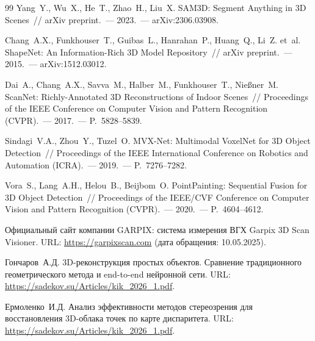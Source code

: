 \documentclass{misisarticle}
\begin{document}
\begin{thebibliography}{99}
 Yang~Y., Wu~X., He~T., Zhao~H., Liu~X. SAM3D: Segment Anything in 3D Scenes~// arXiv preprint.~--- 2023.~--- arXiv:2306.03908.

 Chang~A.X., Funkhouser~T., Guibas~L., Hanrahan~P., Huang~Q., Li~Z. et~al. ShapeNet: An Information-Rich 3D Model Repository~// arXiv preprint.~--- 2015.~--- arXiv:1512.03012.

 Dai~A., Chang~A.X., Savva~M., Halber~M., Funkhouser~T., Nie{\ss}ner~M. ScanNet: Richly-Annotated 3D Reconstructions of Indoor Scenes~// Proceedings of the IEEE Conference on Computer Vision and Pattern Recognition (CVPR).~--- 2017.~--- P.~5828--5839.

 Sindagi~V.A., Zhou~Y., Tuzel~O. MVX-Net: Multimodal VoxelNet for 3D Object Detection~// Proceedings of the IEEE International Conference on Robotics and Automation (ICRA).~--- 2019.~--- P.~7276--7282.

 Vora~S., Lang~A.H., Helou~B., Beijbom~O. PointPainting: Sequential Fusion for 3D Object Detection~// Proceedings of the IEEE/CVF Conference on Computer Vision and Pattern Recognition (CVPR).~--- 2020.~--- P.~4604--4612.

 Официальный сайт компании GARPIX: система измерения ВГХ Garpix 3D Scan Visioner. URL: \url{https://garpixscan.com} (дата обращения: 10.05.2025).

 Гончаров~А.Д. 3D-реконструкция простых объектов. Сравнение традиционного геометрического метода и end-to-end нейронной сети. URL: \url{https://sadekov.su/Articles/kik_2026_1.pdf}.

 Ермоленко~И.Д. Анализ эффективности методов стереозрения для восстановления 3D-облака точек по карте диспаритета. URL: \url{https://sadekov.su/Articles/kik_2026_1.pdf}.

\end{thebibliography}
\end{document}
